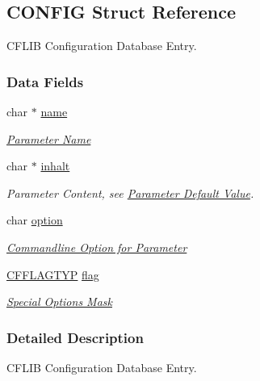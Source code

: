 \hypertarget{struct_c_o_n_f_i_g}{
\subsection{CONFIG Struct Reference}
\label{struct_c_o_n_f_i_g}
}
CFLIB Configuration Database Entry.  


\subsubsection*{Data Fields}
\begin{CompactItemize}
\item 
\hypertarget{struct_c_o_n_f_i_g_196d63e311e3d1aa79fe4f16f20ce2a5}{
char $\ast$ \hyperlink{struct_c_o_n_f_i_g_196d63e311e3d1aa79fe4f16f20ce2a5}{name}}
\label{struct_c_o_n_f_i_g_196d63e311e3d1aa79fe4f16f20ce2a5}

\begin{CompactList}\small\item\em \hyperlink{config_initializer_parameter_name}{Parameter Name} \item\end{CompactList}\item 
\hypertarget{struct_c_o_n_f_i_g_b8cae13203b07fabaa40e407fa8dbdfb}{
char $\ast$ \hyperlink{struct_c_o_n_f_i_g_b8cae13203b07fabaa40e407fa8dbdfb}{inhalt}}
\label{struct_c_o_n_f_i_g_b8cae13203b07fabaa40e407fa8dbdfb}

\begin{CompactList}\small\item\em Parameter Content, see \hyperlink{config_initializer_parameter_default}{Parameter Default Value}. \item\end{CompactList}\item 
\hypertarget{struct_c_o_n_f_i_g_60563bd93e85c1ddb8291a2d27a9c472}{
char \hyperlink{struct_c_o_n_f_i_g_60563bd93e85c1ddb8291a2d27a9c472}{option}}
\label{struct_c_o_n_f_i_g_60563bd93e85c1ddb8291a2d27a9c472}

\begin{CompactList}\small\item\em \hyperlink{config_initializer_parameter_option}{Commandline Option for Parameter} \item\end{CompactList}\item 
\hypertarget{struct_c_o_n_f_i_g_b04d08abdf758c0400caaded716f4089}{
\hyperlink{group__special__options__mask_g4854f1596d5c6e0604a478fa9a2e23f0}{CFFLAGTYP} \hyperlink{struct_c_o_n_f_i_g_b04d08abdf758c0400caaded716f4089}{flag}}
\label{struct_c_o_n_f_i_g_b04d08abdf758c0400caaded716f4089}

\begin{CompactList}\small\item\em \hyperlink{group__special__options__mask}{Special Options Mask} \item\end{CompactList}\end{CompactItemize}


\subsubsection{Detailed Description}
CFLIB Configuration Database Entry. 